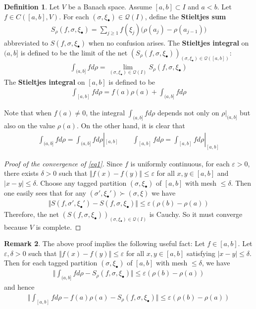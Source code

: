 \documentclass[12pt,b5paper,notitlepage]{article}
\theoremstyle{definition}
\newtheorem{df}{Definition}[subsection]
\newtheorem{rem}[df]{Remark}
\theoremstyle{plain}
\newcommand{\mc}{\mathcal}
\newcommand{\blt}{\bullet}
\newcommand{\eps}{\varepsilon}
\numberwithin{equation}{section}
\begin{document}
\begin{df}\label{lb66}
Let $V$ be a Banach space. Assume $[a,b]\subset I$ and $a<b$. Let $f\in C([a,b],V)$. For each $(\sigma,\xi_\blt)\in\mc Q(I)$, define the \textbf{Stieltjes sum} \index{Sf@$S_\rho(f,\sigma,\xi_\blt)$}
\begin{align*}
S_\rho(f,\sigma,\xi_\blt)=\sum_{j\geq 1}f(\xi_j)\big(\rho(a_j)-\rho(a_{j-1})\big)
\end{align*}
abbreviated to $S(f,\sigma,\xi_\blt)$ when no confusion arises. The \textbf{Stieltjes integral}  on $(a,b]$ is defined to be the limit of the net $(S_\rho(f,\sigma,\xi_\blt))_{(\sigma,\xi_\blt)\in\mc Q([a,b])}$:
\begin{align}\label{eq1}
\int_{(a,b]} fd\rho=\lim_{(\sigma,\xi_\blt)\in\mc Q(I)}S_\rho(f,\sigma,\xi_\blt)
\end{align}
The \textbf{Stieltjes integral} on $[a,b]$ is defined to be
\begin{align}
\int_{[a,b]}fd\rho=f(a)\rho(a)+\int_{(a,b]}fd\rho
\end{align}
\end{df}


Note that when $f(a)\neq0$, the integral $\int_{(a,b]}fd\rho$ depends not only on $\rho|_{(a,b]}$ but also on the value $\rho(a)$. On the other hand, it is clear that
\begin{gather}
\int_{(a,b]}fd\rho=\int_{(a,b]}fd\rho|_{[a,b]}\qquad \int_{[a,b]}fd\rho=\int_{[a,b]}fd\rho|_{[a,b]}
\end{gather}


\begin{proof}[Proof of the convergence of \eqref{eq1}]
Since $f$ is uniformly continuous, for each $\eps>0$, there exists $\delta>0$ such that $\Vert f(x)-f(y)\Vert\leq\eps$ for all $x,y\in[a,b]$ and $|x-y|\leq\delta$. Choose any tagged partition $(\sigma,\xi_\blt)$ of $[a,b]$ with mesh $\leq\delta$. Then one easily sees that for any $(\sigma',\xi_\blt')\succ(\sigma,\xi)$ we have
\begin{align*}
\Vert S(f,\sigma',\xi_\blt')-S(f,\sigma,\xi_\blt)\Vert\leq \eps(\rho(b)-\rho(a))
\end{align*}
Therefore, the net $(S(f,\sigma,\xi_\blt))_{(\sigma,\xi_\blt)\in\mc Q(I)}$ is Cauchy. So it must converge because $V$ is complete.
\end{proof}

\begin{rem}\label{lb63}
The above proof implies the following useful fact: Let $f\in[a,b]$. Let $\eps,\delta>0$ such that $\Vert f(x)-f(y)\Vert\leq\eps$ for all $x,y\in[a,b]$ satisfying $|x-y|\leq\delta$. Then for each tagged partition $(\sigma,\xi_\blt)$ of $[a,b]$ with mesh $\leq\delta$, we have
\begin{align}
\Big\Vert \int_{(a,b]}fd\rho-S_\rho(f,\sigma,\xi_\blt)\Big\Vert\leq \eps(\rho(b)-\rho(a))
\end{align}
and hence
\begin{align}
\Big\Vert \int_{[a,b]}fd\rho-f(a)\rho(a)-S_\rho(f,\sigma,\xi_\blt)\Big\Vert\leq \eps(\rho(b)-\rho(a))
\end{align}
\end{rem}
\end{document}
